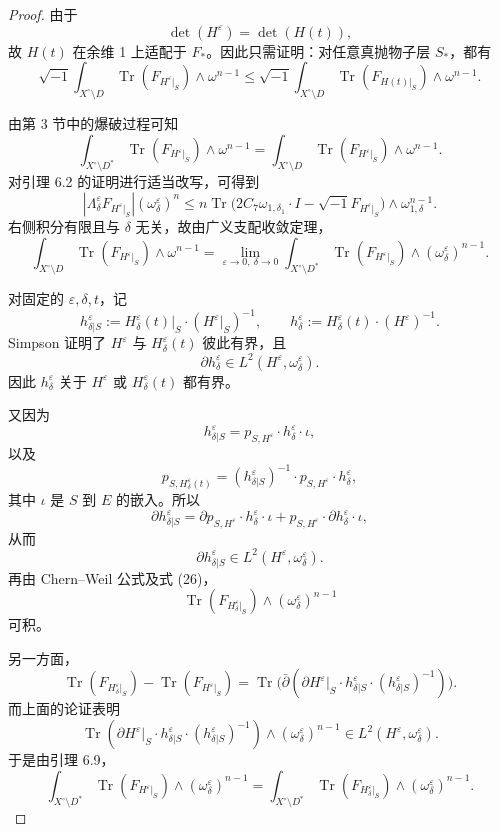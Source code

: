 \documentclass[12pt,a4paper]{article}
\newcommand{\Tr}{\operatorname{Tr}}
\begin{document}
\begin{proof}
由于
\[
\det(H^\varepsilon)=\det(H(t)),
\]
故 \(H(t)\) 在余维 1 上适配于 \(F_*\)。因此只需证明：对任意真抛物子层 \(S_*\)，都有
\[
\sqrt{-1}\int_{X^\circ\setminus D}\Tr(F_{H^\varepsilon|_S})\wedge \omega^{n-1}
\le
\sqrt{-1}\int_{X^\circ\setminus D}\Tr(F_{H(t)|_S})\wedge \omega^{n-1}.
\]

由第 3 节中的爆破过程可知
\[
\int_{X^\circ\setminus D^*}\Tr(F_{H^\varepsilon|_S})\wedge \omega^{n-1}
=
\int_{X^\circ\setminus D}\Tr(F_{H^\varepsilon|_S})\wedge \omega^{n-1}.
\]
对引理 6.2 的证明进行适当改写，可得到
\[
|\Lambda^\varepsilon_\delta F_{H^\varepsilon|_S}|(\omega^\varepsilon_\delta)^n
\le
n\Tr\bigl(2C_7\omega_{1,\delta_1}\cdot I-\sqrt{-1}F_{H^\varepsilon|_S}\bigr)\wedge \omega_{1,\delta}^{n-1}.
\]
右侧积分有限且与 \(\delta\) 无关，故由广义支配收敛定理，
\[
\int_{X^\circ\setminus D}\Tr(F_{H^\varepsilon|_S})\wedge \omega^{n-1}
=
\lim_{\varepsilon\to 0,\ \delta\to 0}
\int_{X^\circ\setminus D^*}\Tr(F_{H^\varepsilon|_S})\wedge (\omega^\varepsilon_\delta)^{n-1}.
\]

对固定的 \(\varepsilon,\delta,t\)，记
\[
h^\varepsilon_{\delta|S}:=H^\varepsilon_\delta(t)|_S\cdot (H^\varepsilon|_S)^{-1},
\qquad
h^\varepsilon_\delta:=H^\varepsilon_\delta(t)\cdot (H^\varepsilon)^{-1}.
\]
Simpson \cite{SimpsonConstruct} 证明了 \(H^\varepsilon\) 与 \(H^\varepsilon_\delta(t)\) 彼此有界，且
\[
\partial h^\varepsilon_\delta\in L^2(H^\varepsilon,\omega^\varepsilon_\delta).
\]
因此 \(h^\varepsilon_\delta\) 关于 \(H^\varepsilon\) 或 \(H^\varepsilon_\delta(t)\) 都有界。

又因为
\[
h^\varepsilon_{\delta|S}=p_{S,H^\varepsilon}\cdot h^\varepsilon_\delta \cdot \iota, \tag{25}
\]
以及
\[
p_{S,H^\varepsilon_\delta(t)}
=
(h^\varepsilon_{\delta|S})^{-1}\cdot p_{S,H^\varepsilon}\cdot h^\varepsilon_\delta, \tag{26}
\]
其中 \(\iota\) 是 \(S\) 到 \(E\) 的嵌入。所以
\[
\partial h^\varepsilon_{\delta|S}
=
\partial p_{S,H^\varepsilon}\cdot h^\varepsilon_\delta\cdot \iota
+
p_{S,H^\varepsilon}\cdot \partial h^\varepsilon_\delta\cdot \iota,
\]
从而
\[
\partial h^\varepsilon_{\delta|S}\in L^2(H^\varepsilon,\omega^\varepsilon_\delta).
\]
再由 Chern--Weil 公式及式 (26)，
\[
\Tr(F_{H^\varepsilon_\delta|_S})\wedge (\omega^\varepsilon_\delta)^{n-1}
\]
可积。

另一方面，
\[
\Tr(F_{H^\varepsilon_\delta|_S})-\Tr(F_{H^\varepsilon|_S})
=
\Tr\bigl(\bar\partial(\partial H^\varepsilon|_S\cdot h^\varepsilon_{\delta|S}\cdot (h^\varepsilon_{\delta|S})^{-1})\bigr).
\]
而上面的论证表明
\[
\Tr(\partial H^\varepsilon|_S\cdot h^\varepsilon_{\delta|S}\cdot (h^\varepsilon_{\delta|S})^{-1})
\wedge (\omega^\varepsilon_\delta)^{n-1}
\in L^2(H^\varepsilon,\omega^\varepsilon_\delta).
\]
于是由引理 6.9，
\[
\int_{X^\circ\setminus D^*}
\Tr(F_{H^\varepsilon|_S})\wedge (\omega^\varepsilon_\delta)^{n-1}
=
\int_{X^\circ\setminus D^*}
\Tr(F_{H^\varepsilon_\delta|_S})\wedge (\omega^\varepsilon_\delta)^{n-1}.
\]


\end{proof}
\end{document}
